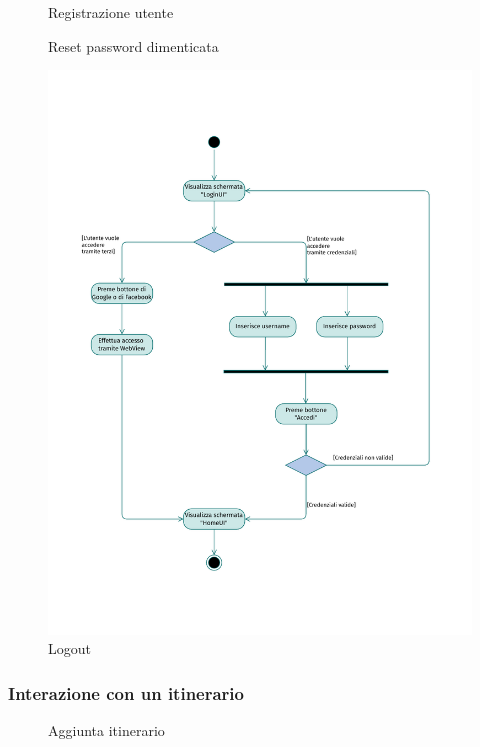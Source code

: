 \documentclass{natourDoc}
\begin{document}
\newpage
\begin{figure}[!htbp]
	\centering
	
	\caption{Registrazione utente}
\end{figure}
\FloatBarrier

\newpage
\begin{figure}[!htbp]
	\centering
	
	\caption{Reset password dimenticata}
\end{figure}
\FloatBarrier

\newpage
\begin{figure}[!htbp]
	\centering
	\includegraphics[width=\textwidth, page=16]{./diagrams/activity.pdf}
	\caption{Logout}
\end{figure}
\FloatBarrier


\newpage
\subsubsection{Interazione con un itinerario}
\begin{figure}[!htbp]
	\centering
	
	\caption{Aggiunta itinerario}
\end{figure}
\FloatBarrier
\end{document}
